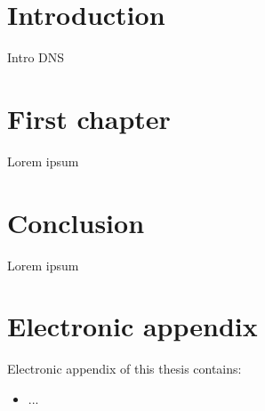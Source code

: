 \documentclass[
  digital, %
  oneside, %
  lof,     %
  nolot,     %
]{fithesis4}
\begin{document}
\clearpage
\printnoidxglossary[title={Abbreviations}, type=\acronymtype]

\chapter*{Introduction}
Intro \acrfull{DNS}

\chapter{First chapter}
\label{ch:first}
Lorem ipsum


\chapter*{Conclusion}
Lorem ipsum


\appendix
\chapter{Electronic appendix}
\label{ch:e_appendix}
Electronic appendix of this thesis contains:
\begin{itemize}
    \item ...
\end{itemize}
\end{document}
